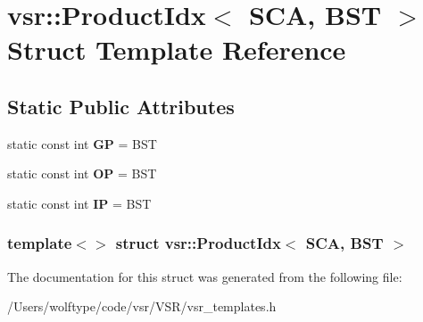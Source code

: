\hypertarget{structvsr_1_1_product_idx_3_01_s_c_a_00_01_b_s_t_01_4}{\section{vsr\-:\-:Product\-Idx$<$ S\-C\-A, B\-S\-T $>$ Struct Template Reference}
\label{structvsr_1_1_product_idx_3_01_s_c_a_00_01_b_s_t_01_4}
}
\subsection*{Static Public Attributes}
\begin{DoxyCompactItemize}
\item 
\hypertarget{structvsr_1_1_product_idx_3_01_s_c_a_00_01_b_s_t_01_4_af3ece4ac1f5c4d19366debd09e63dfd0}{static const int {\bfseries G\-P} = B\-S\-T}\label{structvsr_1_1_product_idx_3_01_s_c_a_00_01_b_s_t_01_4_af3ece4ac1f5c4d19366debd09e63dfd0}

\item 
\hypertarget{structvsr_1_1_product_idx_3_01_s_c_a_00_01_b_s_t_01_4_a5fb8b41f2c958d597c51e48f997d29c6}{static const int {\bfseries O\-P} = B\-S\-T}\label{structvsr_1_1_product_idx_3_01_s_c_a_00_01_b_s_t_01_4_a5fb8b41f2c958d597c51e48f997d29c6}

\item 
\hypertarget{structvsr_1_1_product_idx_3_01_s_c_a_00_01_b_s_t_01_4_ab5f6f037f1a334153d3fec49cdd5ce12}{static const int {\bfseries I\-P} = B\-S\-T}\label{structvsr_1_1_product_idx_3_01_s_c_a_00_01_b_s_t_01_4_ab5f6f037f1a334153d3fec49cdd5ce12}

\end{DoxyCompactItemize}
\subsubsection*{template$<$$>$ struct vsr\-::\-Product\-Idx$<$ S\-C\-A, B\-S\-T $>$}



The documentation for this struct was generated from the following file\-:\begin{DoxyCompactItemize}
\item 
/\-Users/wolftype/code/vsr/\-V\-S\-R/vsr\-\_\-templates.\-h\end{DoxyCompactItemize}
